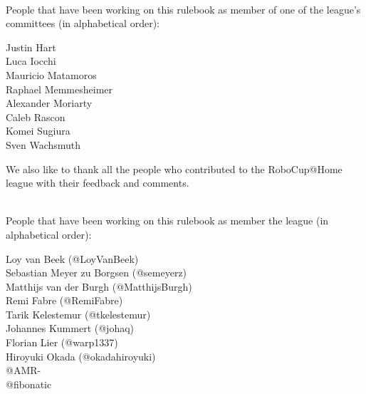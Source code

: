 ~\\\noindent People that have been working on this rulebook as member of one of the league's committees (in alphabetical order):
\begin{center}
\begin{minipage}{0.8\textwidth}
\begin{multicols}{3}%
\footnotesize
\noindent%

Justin Hart\\
Luca Iocchi\\
Mauricio Matamoros\\
\columnbreak
Raphael Memmesheimer\\
Alexander Moriarty\\
Caleb Rascon\\
\columnbreak
Komei Sugiura\\
Sven Wachsmuth\\
\end{multicols}
\end{minipage}
\end{center}

We also like to thank all the people who contributed to the RoboCup@Home league with their feedback and comments.

~\\\noindent People that have been working on this rulebook as member the league (in alphabetical order):
\begin{center}
\begin{minipage}{0.8\textwidth}
\begin{multicols}{2}%
\footnotesize
\noindent%
Loy van Beek (@LoyVanBeek)\\
Sebastian Meyer zu Borgsen (@semeyerz)\\
Matthijs van der Burgh (@MatthijsBurgh)\\
Remi Fabre (@RemiFabre)\\
Tarik Kelestemur (@tkelestemur)\\
\columnbreak%
Johannes Kummert (@johaq)\\
Florian Lier (@warp1337)\\
Hiroyuki Okada (@okadahiroyuki)\\
@AMR-\\
@fibonatic\\
\end{multicols}
\end{minipage}
\end{center}


